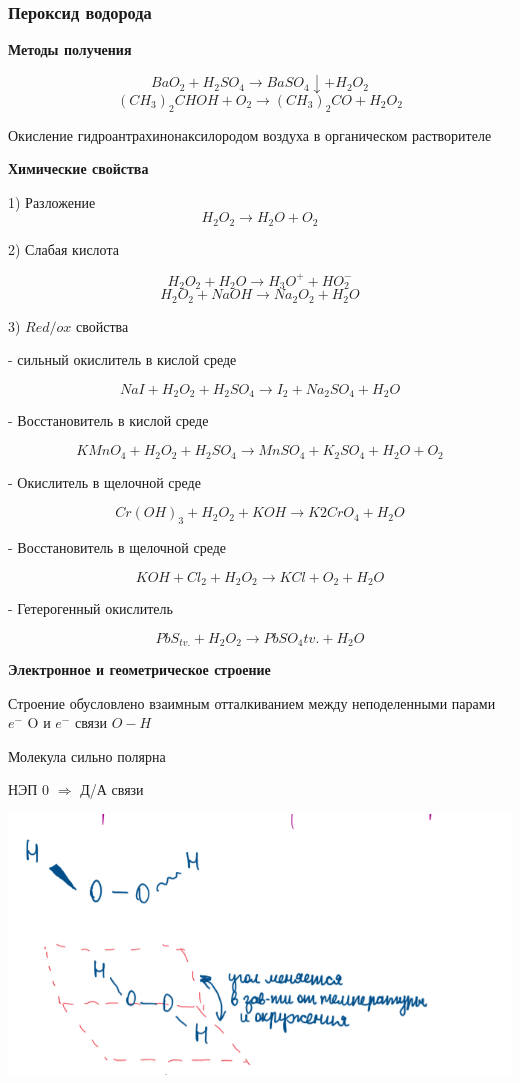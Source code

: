 \subsubsection*{Пероксид водорода}

\textbf{Методы получения}

$$BaO_2 + H_2SO_4 \rightarrow BaSO_4\downarrow + H_2O_2$$
$$ (CH_3)_2CHOH + O_2 \rightarrow (CH_3)_2CO + H_2O_2$$

Окисление гидроантрахинонаксилородом воздуха в органическом растворителе

\textbf{Химические свойства}

1) Разложение
$$H_2O_2 \rightarrow H_2O + O_2$$

2) Слабая кислота

$$H_2O_2 + H_2O \rightarrow H_3O^+ + HO_2^-$$
$$H_2O_2 + NaOH \rightarrow Na_2O_2 + H_2O$$

3) $Red/ox$ свойства

- сильный окислитель в кислой среде

$$NaI + H_2O_2 + H_2SO_4 \rightarrow I_2 + Na_2SO_4 + H_2O$$

- Восстановитель в кислой среде

$$KMnO_4 + H_2O_2 + H_2SO_4 \rightarrow MnSO_4 + K_2SO_4 + H_2O + O_2$$

- Окислитель в щелочной среде

$$Cr(OH)_3 + H_2O_2 + KOH \rightarrow K2CrO_4 + H_2O$$

- Восстановитель в щелочной среде

$$KOH + Cl_2 + H_2O_2 \rightarrow KCl + O_2 + H_2O$$

- Гетерогенный окислитель

$$PbS_{tv.} + H_2O_2 \rightarrow PbSO_4{tv.} + H_2O$$

\textbf{Электронное и геометрическое строение}

Строение обусловлено взаимным отталкиванием между неподеленными парами $e^-$ O и $e^-$ связи $O-H$

Молекула сильно полярна

НЭП 0 $\Rightarrow$ Д/А связи

\includegraphics[scale=0.95]{images/6v3.png}

